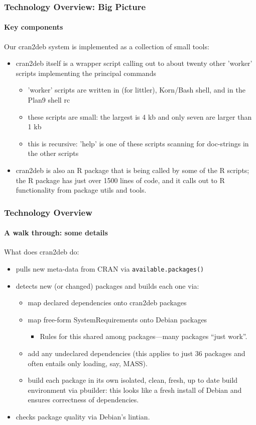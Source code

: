 \documentclass[smaller,compress]{beamer}
\begin{document}
\begin{frame}
  \frametitle{Technology Overview: Big Picture}
  \framesubtitle{Key components}

  Our cran2deb system is implemented as a collection of small tools:
  \begin{itemize}
  \item cran2deb itself is a wrapper script calling out to about twenty other
    'worker' scripts implementing the principal commands
    \begin{itemize}
    \item 'worker' scripts are written in \R (for littler), Korn/Bash shell,
      and in the Plan9 shell rc
    \item these scripts are small: the largest is 4 kb and only seven
      are larger than 1 kb
    \item this is recursive: 'help' is one of these scripts scanning for
      doc-strings in the other scripts
    \end{itemize}
  \item cran2deb is also an R package that is being called by some of the R
    scripts; the R package has just over 1500 lines of code, and it calls out
    to R functionality from package utils and tools.
  \end{itemize}
\end{frame}  

\begin{frame}
  \frametitle{Technology Overview} 
  \framesubtitle{A walk through: some details}

  What does cran2deb do:
  \begin{itemize}
  \item pulls new meta-data from CRAN via \texttt{available.packages()}
  \item detects new (or changed) packages and builds each one via:
    \begin{itemize}
    \item map declared \R dependencies onto cran2deb packages
    \item map free-form SystemRequirements onto Debian packages
      \begin{itemize}
      \item Rules for this shared among packages---many packages ``just work''.
      \end{itemize}
    \item add any undeclared dependencies (this applies to just 36 packages
      and often entails only loading, say, MASS).
    \item build each package in its own isolated, clean, fresh, up to date
      build environment via pbuilder: this looks like a fresh install of
      Debian and ensures correctness of dependencies. 
    \end{itemize}
  \item checks package quality via Debian's lintian.
  \end{itemize}
\end{frame}  
\end{document}

